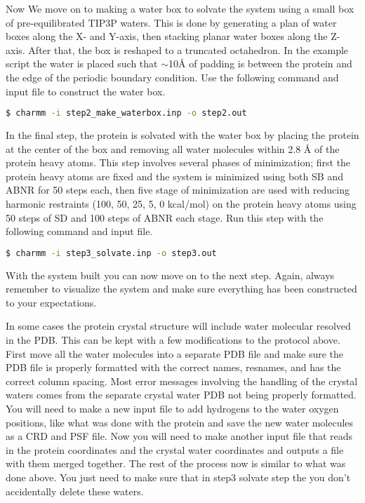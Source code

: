 \documentclass[9pt,tutorial]{livecoms}
\begin{document}
Now We move on to making a water box to solvate the system using a small box of pre-equilibrated TIP3P waters.
This is done by generating a plan of water boxes along the X- and Y-axis, then stacking planar water boxes along the Z-axis.
After that, the box is reshaped to a truncated octahedron. 
In the example script the water is placed such that $\sim$10$\mbox{\AA}$ of padding is between the protein and the edge of the periodic boundary condition.
Use the following command and input file to construct the water box.
%
\begin{lstlisting}[language=bash]
$ charmm -i step2_make_waterbox.inp -o step2.out
\end{lstlisting}
%
In the final step, the protein is solvated with the water box by placing the protein at the center of the box and removing all water molecules within 2.8 $\mbox{\AA}$ of the protein heavy atoms. 
This step involves several phases of minimization; first the protein heavy atoms are fixed and the system is minimized using both SB and ABNR for 50 steps each, then five stage of minimization are used with reducing harmonic restraints (100, 50, 25, 5, 0 kcal/mol) on the protein heavy atoms using 50 steps of SD and 100 steps of ABNR each stage. 
Run this step with the following command and input file.
%
\begin{lstlisting}[language=bash]
$ charmm -i step3_solvate.inp -o step3.out
\end{lstlisting}
%
With the system built you can now move on to the next step. 
Again, always remember to visualize the system and make sure everything has been constructed to your expectations. 

In some cases the protein crystal structure will include water molecular resolved in the PDB. 
This can be kept with a few modifications to the protocol above. 
First move all the water molecules into a separate PDB file and make sure the PDB file is properly formatted with the correct names, resnames, and has the correct column spacing.
Most error messages involving the handling of the crystal waters comes from the separate crystal water PDB not being properly formatted. 
You will need to make a new input file to add hydrogens to the water oxygen positions, like what was done with the protein and save the new water molecules as a CRD and PSF file. 
Now you will need to make another input file that reads in the protein coordinates and the crystal water coordinates and outputs a file with them merged together. 
The rest of the process now is similar to what was done above. 
You just need to make sure that in step3 solvate step the you don't accidentally delete these waters.
\end{document}
